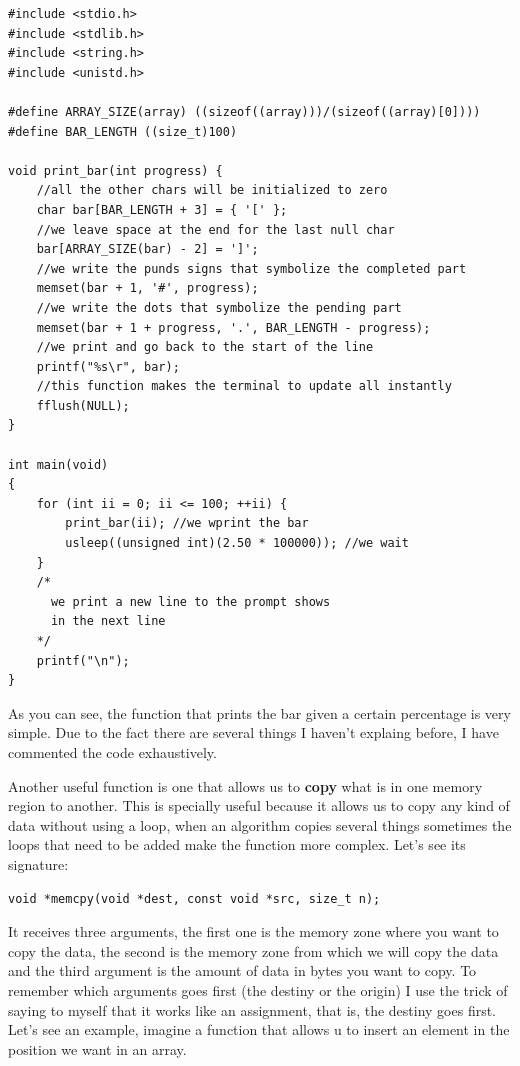 \documentclass[a4paper]{article}
\begin{document}
\noindent
\begin{minipage}[H]{\linewidth}
\mbox{}
\begin{lstlisting}[style=C,
caption={Use of the function \texttt{memset}},
label={lst:memsetExample}]
#include <stdio.h>
#include <stdlib.h>
#include <string.h>
#include <unistd.h>

#define ARRAY_SIZE(array) ((sizeof((array)))/(sizeof((array)[0])))
#define BAR_LENGTH ((size_t)100)

void print_bar(int progress) {
    //all the other chars will be initialized to zero
    char bar[BAR_LENGTH + 3] = { '[' };
    //we leave space at the end for the last null char
    bar[ARRAY_SIZE(bar) - 2] = ']';
    //we write the punds signs that symbolize the completed part
    memset(bar + 1, '#', progress);
    //we write the dots that symbolize the pending part
    memset(bar + 1 + progress, '.', BAR_LENGTH - progress);
    //we print and go back to the start of the line
    printf("%s\r", bar);
    //this function makes the terminal to update all instantly
    fflush(NULL);
}

int main(void)
{
    for (int ii = 0; ii <= 100; ++ii) {
        print_bar(ii); //we wprint the bar
        usleep((unsigned int)(2.50 * 100000)); //we wait
    }
    /*
      we print a new line to the prompt shows
      in the next line
    */
    printf("\n");
}
\end{lstlisting}
\end{minipage}

As you can see, the function that prints the bar given a certain percentage is
very simple. Due to the fact there are several things I haven't explaing before,
I have commented the code exhaustively.

Another useful function is one that allows us to \textbf{copy} what is in one
memory region to another. This is specially useful because it allows us to copy
any kind of data without using a loop, when an algorithm copies several things
sometimes the loops that need to be added make the function more complex.
Let's see its signature:

\noindent
\begin{minipage}[H]{\linewidth}
\mbox{}
\begin{lstlisting}[style=C,
caption={Signature of function \texttt{memcpy}},
label={lst:memcpy}]
void *memcpy(void *dest, const void *src, size_t n);
\end{lstlisting}
\end{minipage}

It receives three arguments, the first one is the memory zone where you want to
copy the data, the second is the memory zone from which we will copy the data
and the third argument is the amount of data in bytes you want to copy. To
remember which arguments goes first (the destiny or the origin) I use the trick
of saying to myself that it works like an assignment, that is, the destiny goes
first. Let's see an example, imagine a function that allows u to insert an
element in the position we want in an array.
\end{document}

